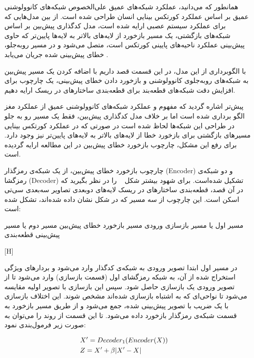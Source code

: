 همانطور که می‌دانید، عملکرد شبکه‌های عمیق علی‌الخصوص شبکه‌های کانوولوشنی عمیق بر اساس عملکرد کورتکس بینایی انسان طراحی شده است. از بین مدل‌هایی که برای عملکرد سیستم عصبی ارایه شده است، مدل کدگذاری پیش‌بین  بر اساس شبکه‌های بازگشتی، یک مسیر بازخورد از لایه‌های بالاتر به لایه‌ها پایین‌تر که حاوی پیش‌بینی عملکرد ناحیه‌های پایینی کورتکس است، متصل می‌شود و در مسیر روبه‌جلو، خطای پیش‌بینی شده جریان می‌یابد .  

با الگوبرداری از این مدل، در این قسمت قصد داریم با اضافه کردن یک مسیر پیش‌بین به شبکه‌های روبه‌جلوی کانوولوشنی و بازخورد دادن خطای پیش‌بینی، یک چارچوب برای افزایش دقت شبکه‌های قطعه‌بند برای قطعه‌بندی ساختارهای در ریسک ارایه دهیم.

پیش‌تر اشاره گردید که مفهوم و عملکرد شبکه‌های کانوولوشنی عمیق از عملکرد مغز الگو برداری شده است اما بر خلاف مدل‌ کدگذاری پیش‌بین، فقط یک مسیر رو به جلو در طراحی این شبکه‌ها لحاظ شده است در صورتی که در عملکرد کورتکس بینایی مسیرهای بازگشتی برای بازخورد خطا از لایه‌های بالاتر به لایه‌های پایین‌تر نیز وجود دارد. برای رفع این مشکل، چارچوب بازخورد خطای پیش‌بین در این مطالعه ارایه گردیده است.


چارچوب بازخورد خطای پیش‌بین، از یک شبکه‌ی رمزگذار (Encoder) و دو شبکه‌ی رمزگشا (Decoder) تشکیل شده‌است. برای شهود بیشتر شکل ~ را در نظر بگیرید که در آن قصد، قطعه‌بندی ساختارهای در ریسک لایه‌های دوبعدی تصاویر سه‌بعدی سی‌تی اسکن است. این چارچوب از سه مسیر که در شکل نشان داده شده‌اند، تشکل شده است:

 مسیر اول یا مسیر بازسازی ورودی
 مسیر بازخورد خطای پیش‌بین
 مسیر دوم یا مسیر پیش‌بینی قطعه‌بندی

[H]

در مسیر اول ابتدا تصویر ورودی به شبکه‌ی کدگذار وارد می‌شود و بردارهای ویژگی استخراج شده از آن، به شبکه رمزگشای اول (قسمت بازسازی) وارد می‌شود تا از تصویر ورودی یک بازسازی حاصل شود. سپس این بازسازی با تصویر اولیه مقایسه‌ می‌شود تا نواحی‌ای که به اشتباه بازسازی شده‌اند مشخص شوند. این اختلاف بازسازی با یک ضریب با تصویر پیش‌بینی شده، جمع می‌شود و از طریق مسیر بازخورد به قسمت شبکه‌ی رمزگذار بازخورد داده می‌شود. تا این قسمت از روند را می‌توان به صورت زیر فرمول‌بندی نمود:

\begin{alignat}{5}
	&X' = Decoder_1(Encoder(X))    \label{recpep} && \\
	&Z = X' + \beta|X'-X| && \notag
\end{alignat}

